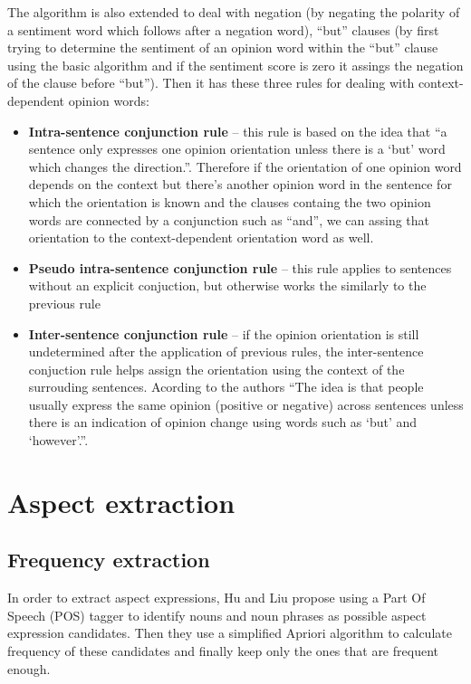 The algorithm is also extended to deal with negation (by negating the polarity of a sentiment word which follows after a negation word), ``but'' clauses (by first trying to determine the sentiment of an opinion word within the ``but'' clause using the basic algorithm and if the sentiment score is zero it assings the negation of the clause before ``but''). Then it has these three rules for dealing with context-dependent opinion words:
\begin{itemize}
\item \textbf{Intra-sentence conjunction rule} -- this rule is based on the idea that ``a sentence only expresses one opinion
orientation unless there is a `but' word which changes the
direction.''\cite{ding_hu_liu}. Therefore if the orientation of one opinion word depends on the context but there's another opinion word in the sentence for which the orientation is known and the clauses containg the two opinion words are connected by a conjunction such as ``and'', we can assing that orientation to the context-dependent orientation word as well.
\item \textbf{Pseudo intra-sentence conjunction rule} -- this rule applies to sentences without an explicit conjuction, but otherwise works the similarly to the previous rule
\item \textbf{Inter-sentence conjunction rule} -- if the opinion orientation is still undetermined after the application of previous rules, the inter-sentence conjuction rule helps assign the orientation using the context of the surrouding sentences. Acording to the authors ``The idea is that people usually express the same
opinion (positive or negative) across sentences unless there is
an indication of opinion change using words such as `but' and
`however'.''\cite{ding_hu_liu}.
\end{itemize}
\section{Aspect extraction}
\subsection{Frequency extraction}
In order to extract aspect expressions, Hu and Liu \cite{hu_liu_2015} propose using a Part Of Speech (POS) tagger to identify nouns and noun phrases as possible aspect expression candidates. Then they use a simplified Apriori algorithm to calculate frequency of these candidates and finally keep only the ones that are frequent enough. 
  
